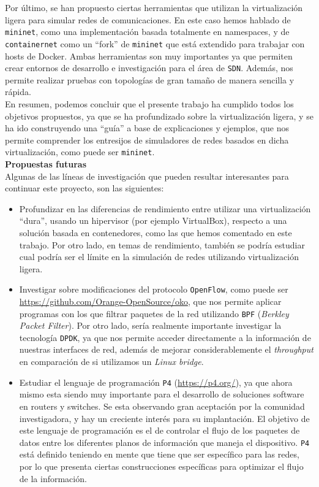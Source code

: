 \documentclass[a4paper, oneside, 12pt]{book}
\begin{document}
	\noindent Por último, se han propuesto ciertas herramientas que utilizan la virtualización ligera para simular redes de comunicaciones. En este caso hemos hablado de \texttt{mininet}, como una implementación basada totalmente en namespaces, y de \texttt{containernet} como un ``fork'' de \texttt{mininet} que está extendido para trabajar con hosts de Docker. Ambas herramientas son muy importantes ya que permiten crear entornos de desarrollo e investigación para el área de \texttt{SDN}. Además, nos permite realizar pruebas con topologías de gran tamaño de manera sencilla y rápida. \\
	
	\noindent En resumen, podemos concluir que el presente trabajo ha cumplido todos los objetivos propuestos, ya que se ha profundizado sobre la virtualización ligera, y se ha ido construyendo una ``guía'' a base de explicaciones y ejemplos, que nos permite comprender los entresijos de simuladores de redes basados en dicha virtualización, como puede ser \texttt{mininet}. \\
	
	\noindent \textbf{\large Propuestas futuras}\\
	
	\noindent Algunas de las líneas de investigación que pueden resultar interesantes para continuar este proyecto, son las siguientes:
	\begin{itemize}
		\item Profundizar en las diferencias de rendimiento entre utilizar una virtualización ``dura'', usando un hipervisor (por ejemplo VirtualBox), respecto a una solución basada en contenedores, como las que hemos comentado en este trabajo. Por otro lado, en temas de rendimiento, también se podría estudiar cual podría ser el límite en la simulación de redes utilizando virtualización ligera.
		
		\item Investigar sobre modificaciones del protocolo \texttt{OpenFlow}, como puede ser \url{https://github.com/Orange-OpenSource/oko}, que nos permite aplicar programas con los que filtrar paquetes de la red utilizando \texttt{BPF} (\textit{Berkley Packet Filter}). Por otro lado, sería realmente importante investigar la tecnología \texttt{DPDK}, ya que nos permite acceder directamente a la información de nuestras interfaces de red, además de mejorar considerablemente el \textit{throughput} en comparación de si utilizamos un \textit{Linux bridge}.
		
		\item Estudiar el lenguaje de programación \texttt{P4} (\url{https://p4.org/}), ya que ahora mismo esta siendo muy importante para el desarrollo de soluciones software en routers y switches. Se esta observando gran aceptación por la comunidad investigadora, y hay un creciente interés para su implantación. El objetivo de este lenguaje de programación es el de controlar el flujo de los paquetes de datos entre los diferentes planos de información que maneja el dispositivo. \texttt{P4} está definido teniendo en mente que tiene que ser específico para las redes, por lo que presenta ciertas construcciones específicas para optimizar el flujo de la información.
	\end{itemize}
\end{document}

